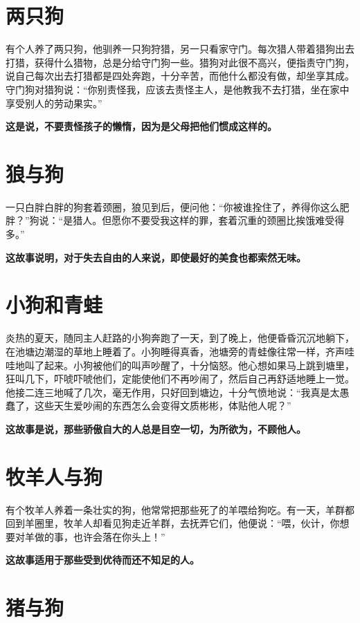 \section{两只狗}

有个人养了两只狗，他驯养一只狗狩猎，另一只看家守门。每次猎人带着猎狗出去打猎，获得什么猎物，总是分给守门狗一些。猎狗对此很不高兴，便指责守门狗，说自己每次出去打猎都是四处奔跑，十分辛苦，而他什么都没有做，却坐享其成。守门狗对猎狗说：“你别责怪我，应该去责怪主人，是他教我不去打猎，坐在家中享受别人的劳动果实。”

{\bfseries \color{red}这是说，不要责怪孩子的懒惰，因为是父母把他们惯成这样的。}

\section{狼与狗}

一只白胖白胖的狗套着颈圈，狼见到后，便问他：“你被谁拴住了，养得你这么肥胖？”狗说：“是猎人。但愿你不要受我这样的罪，套着沉重的颈圈比挨饿难受得多。”

{\bfseries \color{red}这故事说明，对于失去自由的人来说，即使最好的美食也都索然无味。}

\section{小狗和青蛙}

炎热的夏天，随同主人赶路的小狗奔跑了一天，到了晚上，他便昏昏沉沉地躺下，在池塘边潮湿的草地上睡着了。小狗睡得真香，池塘旁的青蛙像往常一样，齐声哇哇地叫了起来。小狗被他们的叫声吵醒了，十分恼怒。他心想如果马上跳到塘里，狂叫几下，吓唬吓唬他们，定能使他们不再吵闹了，然后自己再舒适地睡上一觉。他接二连三地喊了几次，毫无作用，只好回到塘边，十分气愤地说：“我真是太愚蠢了，这些天生爱吵闹的东西怎么会变得文质彬彬，体贴他人呢？”

{\bfseries \color{red}这故事是说，那些骄傲自大的人总是目空一切，为所欲为，不顾他人。}

\section{牧羊人与狗}

有个牧羊人养着一条壮实的狗，他常常把那些死了的羊喂给狗吃。有一天，羊群都回到羊圈里，牧羊人却看见狗走近羊群，去抚弄它们，他便说：“喂，伙计，你想要对羊做的事，也许会落在你头上！”

{\bfseries \color{red}这故事适用于那些受到优待而还不知足的人。}

\section{猪与狗}

